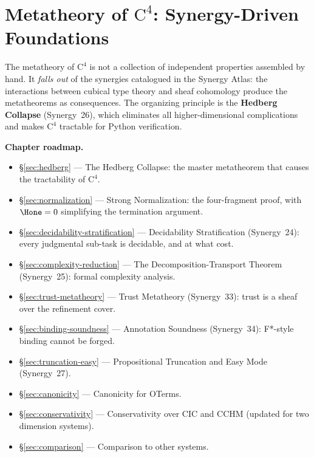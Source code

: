 
\chapter{Metatheory of $\mathrm{C}^4$: Synergy-Driven Foundations}
\label{ch:c4-metatheory}

The metatheory of $\mathrm{C}^4$ is not a collection of independent
properties assembled by hand.  It \emph{falls out} of the synergies
catalogued in the Synergy Atlas: the interactions between cubical type
theory and sheaf cohomology produce the metatheorems as consequences.
The organizing principle is the \textbf{Hedberg Collapse} (Synergy~26),
which eliminates all higher-dimensional complications and makes $\mathrm{C}^4$
tractable for Python verification.

\medskip
\noindent\textbf{Chapter roadmap.}
\begin{itemize}
\item \S\ref{sec:hedberg} --- The Hedberg Collapse: the master metatheorem
  that causes the tractability of $\mathrm{C}^4$.
\item \S\ref{sec:normalization} --- Strong Normalization: the four-fragment
  proof, with $\Hone = 0$ simplifying the termination argument.
\item \S\ref{sec:decidability-stratification} --- Decidability Stratification
  (Synergy~24): every judgmental sub-task is decidable, and at what cost.
\item \S\ref{sec:complexity-reduction} --- The Decomposition-Transport
  Theorem (Synergy~25): formal complexity analysis.
\item \S\ref{sec:trust-metatheory} --- Trust Metatheory (Synergy~33):
  trust is a sheaf over the refinement cover.
\item \S\ref{sec:binding-soundness} --- Annotation Soundness (Synergy~34):
  F*-style binding cannot be forged.
\item \S\ref{sec:truncation-easy} --- Propositional Truncation and Easy Mode
  (Synergy~27).
\item \S\ref{sec:canonicity} --- Canonicity for OTerms.
\item \S\ref{sec:conservativity} --- Conservativity over CIC and CCHM
  (updated for two dimension systems).
\item \S\ref{sec:comparison} --- Comparison to other systems.
\end{itemize}


